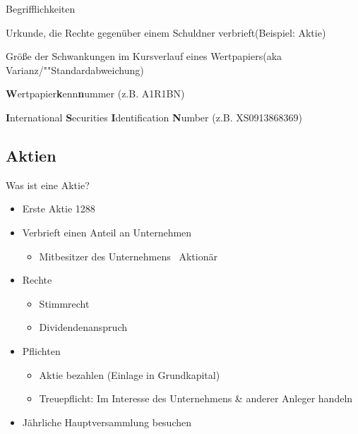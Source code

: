 \documentclass{beamer}
\begin{document}
		\begin{frame}{Begrifflichkeiten}
			\begin{description}[labelwidth=0cm]
				\item[Wertpapier] Urkunde, die Rechte gegenüber einem Schuldner verbrieft(Beispiel: Aktie)
				\item[Volatilität] Größe der Schwankungen im Kursverlauf eines Wertpapiers(aka Varianz/""Standardabweichung)
				\item[WKN] \textbf{W}ertpapier\textbf{k}enn\textbf{n}ummer (z.B. A1R1BN)
				\item[ISIN] \textbf{I}nternational \textbf{S}ecurities \textbf{I}dentification \textbf{N}umber (z.B. XS0913868369)
			\end{description}
		\end{frame}
	
		\subsection{Aktien}
		
			\begin{frame}
				\vspace{0.5cm}
				\begin{center}
					Was ist eine Aktie?
				\end{center}
			\end{frame}
			
			\begin{frame}
				\begin{itemize}
					\item Erste Aktie 1288\citewiki{Aktie}
					\item Verbrieft einen Anteil an Unternehmen
					\begin{itemize}
						\item Mitbesitzer des Unternehmens \textrightarrow\ Aktionär
					\end{itemize}
					\item Rechte
					\begin{itemize}
						\item Stimmrecht
						\item Dividendenanspruch
					\end{itemize}
					\item Pflichten
					\begin{itemize}
						\item Aktie bezahlen (Einlage in Grundkapital)
						\item Treuepflicht: Im Interesse des Unternehmens \& anderer Anleger handeln
					\end{itemize}
					\item Jährliche Hauptversammlung besuchen
				\end{itemize}
			\end{frame}
		
\end{document}
